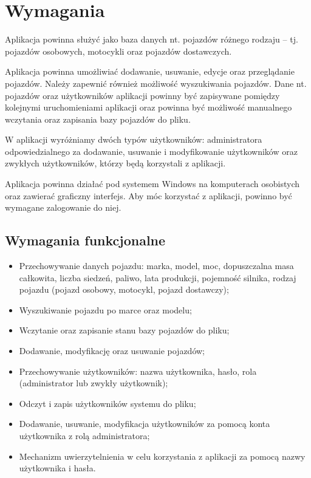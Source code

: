 \chapter{Wymagania}
Aplikacja powinna służyć jako baza danych nt. pojazdów różnego rodzaju -- tj. pojazdów osobowych, motocykli oraz
pojazdów dostawczych.

Aplikacja powinna umożliwiać dodawanie, usuwanie, edycje oraz przeglądanie pojazdów. Należy
zapewnić również możliwość wyszukiwania pojazdów.
Dane nt. pojazdów oraz użytkowników aplikacji powinny być zapisywane pomiędzy kolejnymi uruchomieniami aplikacji oraz
powinna być możliwość manualnego wczytania oraz zapisania bazy pojazdów do pliku.

W aplikacji wyróżniamy dwóch typów użytkowników: administratora odpowiedzialnego za dodawanie, usuwanie i
modyfikowanie użytkowników oraz zwykłych użytkowników, którzy będą korzystali z aplikacji.

Aplikacja powinna działać pod systemem Windows na komputerach osobistych oraz zawierać graficzny interfejs.
Aby móc korzystać z aplikacji, powinno być wymagane zalogowanie do niej.

\section{Wymagania funkcjonalne}
\begin{itemize}
    \item Przechowywanie danych pojazdu: marka, model, moc, dopuszczalna masa całkowita, liczba siedzeń, paliwo,
    lata produkcji, pojemność silnika, rodzaj pojazdu (pojazd osobowy, motocykl, pojazd dostawczy);
    \item Wyszukiwanie pojazdu po marce oraz modelu;
    \item Wczytanie oraz zapisanie stanu bazy pojazdów do pliku;
    \item Dodawanie, modyfikację oraz usuwanie pojazdów;
    \item Przechowywanie użytkowników: nazwa użytkownika, hasło, rola (administrator lub zwykły użytkownik);
    \item Odczyt i zapis użytkowników systemu do pliku;
    \item Dodawanie, usuwanie, modyfikacja użytkowników za pomocą konta użytkownika z rolą administratora;
    \item Mechanizm uwierzytelnienia w celu korzystania z aplikacji za pomocą nazwy użytkownika i hasła.
\end{itemize}

